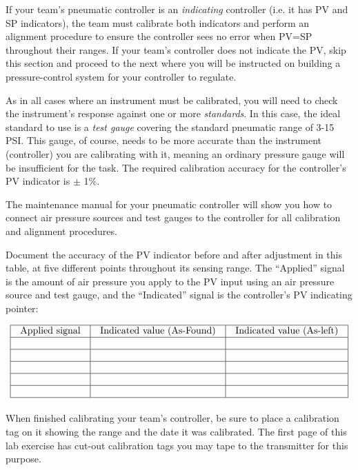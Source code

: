 If your team's pneumatic controller is an {\it indicating} controller (i.e. it has PV and SP indicators), the team must calibrate both indicators and perform an alignment procedure to ensure the controller sees no error when PV=SP throughout their ranges.  If your team's controller does not indicate the PV, skip this section and proceed to the next where you will be instructed on building a pressure-control system for your controller to regulate.

As in all cases where an instrument must be calibrated, you will need to check the instrument's response against one or more {\it standards}.  In this case, the ideal standard to use is a {\it test gauge} covering the standard pneumatic range of 3-15 PSI.  This gauge, of course, needs to be more accurate than the instrument (controller) you are calibrating with it, meaning an ordinary pressure gauge will be insufficient for the task.  The required calibration accuracy for the controller's PV indicator is $\pm$ 1\%.

The maintenance manual for your pneumatic controller will show you how to connect air pressure sources and test gauges to the controller for all calibration and alignment procedures.

\filbreak

Document the accuracy of the PV indicator before and after adjustment in this table, at five different points throughout its sensing range.  The ``Applied'' signal is the amount of air pressure you apply to the PV input using an air pressure source and test gauge, and the ``Indicated'' signal is the controller's PV indicating pointer:


$$\vbox{\offinterlineskip
\halign{\strut
\vrule \quad\hfil # \ \hfil & 
\vrule \quad\hfil # \ \hfil & 
\vrule \quad\hfil # \ \hfil \vrule \cr
\noalign{\hrule}
%
Applied signal & Indicated value (As-Found) & Indicated value (As-left) \cr
%
\noalign{\hrule}
%
 &  & \cr
%
\noalign{\hrule}
%
 &  & \cr
%
\noalign{\hrule}
%
 &  & \cr
%
\noalign{\hrule}
%
 &  & \cr
%
\noalign{\hrule}
%
 &  & \cr
%
\noalign{\hrule}
} %
}$$ %

When finished calibrating your team's controller, be sure to place a calibration tag on it showing the range and the date it was calibrated.  The first page of this lab exercise has cut-out calibration tags you may tape to the transmitter for this purpose.

